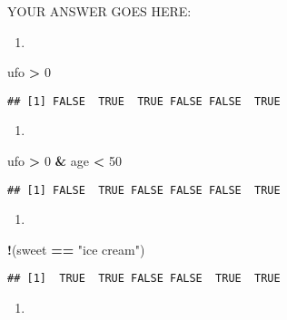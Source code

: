 \documentclass[
]{article}
\newenvironment{Shaded}{\begin{snugshade}}{\end{snugshade}}
\newcommand{\DecValTok}[1]{\textcolor[rgb]{0.00,0.00,0.81}{#1}}
\newcommand{\NormalTok}[1]{#1}
\newcommand{\OperatorTok}[1]{\textcolor[rgb]{0.81,0.36,0.00}{\textbf{#1}}}
\newcommand{\StringTok}[1]{\textcolor[rgb]{0.31,0.60,0.02}{#1}}
\providecommand{\tightlist}{%
  \setlength{\itemsep}{0pt}\setlength{\parskip}{0pt}}
\begin{document}
YOUR ANSWER GOES HERE:

\begin{enumerate}
\def\labelenumi{\arabic{enumi}.}
\tightlist
\item
\end{enumerate}

\begin{Shaded}
\begin{Highlighting}[]
\NormalTok{ufo }\OperatorTok{\textgreater{}}\StringTok{ }\DecValTok{0}
\end{Highlighting}
\end{Shaded}

\begin{verbatim}
## [1] FALSE  TRUE  TRUE FALSE FALSE  TRUE
\end{verbatim}

\begin{enumerate}
\def\labelenumi{\arabic{enumi}.}
\setcounter{enumi}{1}
\tightlist
\item
\end{enumerate}

\begin{Shaded}
\begin{Highlighting}[]
\NormalTok{ufo }\OperatorTok{\textgreater{}}\StringTok{ }\DecValTok{0} \OperatorTok{\&}\StringTok{ }\NormalTok{age }\OperatorTok{\textless{}}\StringTok{ }\DecValTok{50}
\end{Highlighting}
\end{Shaded}

\begin{verbatim}
## [1] FALSE  TRUE FALSE FALSE FALSE  TRUE
\end{verbatim}

\begin{enumerate}
\def\labelenumi{\arabic{enumi}.}
\setcounter{enumi}{2}
\tightlist
\item
\end{enumerate}

\begin{Shaded}
\begin{Highlighting}[]
\OperatorTok{!}\NormalTok{(sweet }\OperatorTok{==}\StringTok{ "ice cream"}\NormalTok{)}
\end{Highlighting}
\end{Shaded}

\begin{verbatim}
## [1]  TRUE  TRUE FALSE FALSE  TRUE  TRUE
\end{verbatim}

\begin{enumerate}
\def\labelenumi{\arabic{enumi}.}
\setcounter{enumi}{3}
\tightlist
\item
\end{enumerate}
\end{document}

